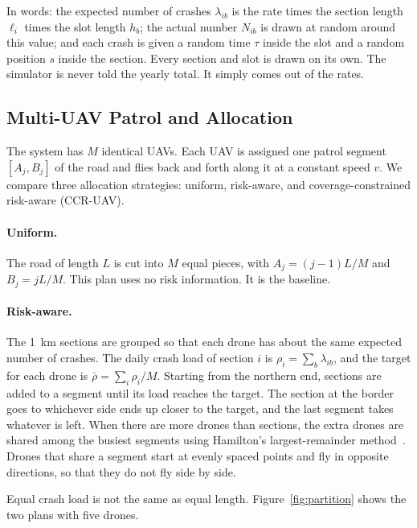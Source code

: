 \documentclass[11pt]{article}
\begin{document}
In words: the expected number of crashes $\lambda_{ib}$ is the rate times the
section length $\ell_i$ times the slot length $h_b$; the actual number
$N_{ib}$ is drawn at random around this value; and each crash is given a random
time $\tau$ inside the slot and a random position $s$ inside the section. Every
section and slot is drawn on its own. The simulator is never told the yearly
total. It simply comes out of the rates.

\subsection{Multi-UAV Patrol and Allocation}
\label{sec:allocation}

The system has $M$ identical UAVs. Each UAV is assigned one patrol segment $[A_j,B_j]$ of the road and flies back and forth along it at a constant speed $v$. We compare three allocation strategies: uniform, risk-aware, and coverage-constrained risk-aware (CCR-UAV).
\paragraph{Uniform.}
The road of length $L$ is cut into $M$ equal pieces, with $A_j=(j-1)L/M$ and
$B_j=jL/M$. This plan uses no risk information. It is the baseline.

\paragraph{Risk-aware.}
The 1~km sections are grouped so that each drone has about the same expected
number of crashes. The daily crash load of section $i$ is
$\rho_i=\sum_b\lambda_{ib}$, and the target for each drone is
$\bar{\rho}=\sum_i\rho_i/M$. Starting from the northern end, sections are added
to a segment until its load reaches the target. The section at the border goes to whichever side ends up closer to the target, and the last segment takes whatever is left. When there are more drones than sections, the extra drones are shared among the busiest segments using Hamilton's largest-remainder method~\cite{balinski1982}. Drones that share a segment start at evenly spaced points and fly in opposite directions, so that they do not fly side by side.

Equal crash load is not the same as equal length.
Figure~\ref{fig:partition} shows the two plans with five drones.
\end{document}
